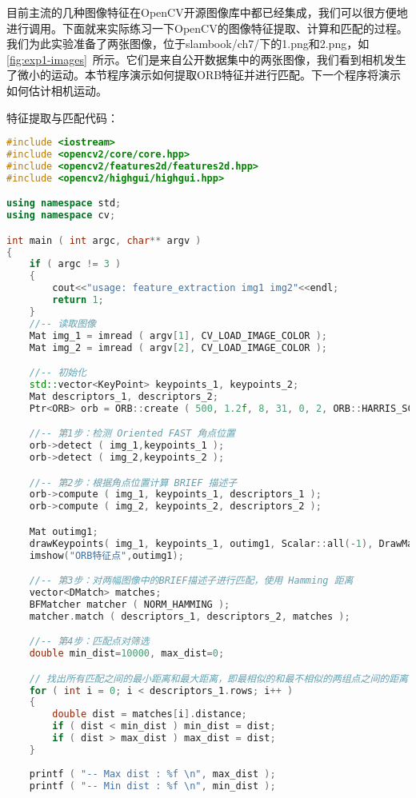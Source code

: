 目前主流的几种图像特征在OpenCV开源图像库中都已经集成，我们可以很方便地进行调用。下面就来实际练习一下OpenCV的图像特征提取、计算和匹配的过程。我们为此实验准备了两张图像，位于slambook/ch7/下的1.png和2.png，如\autoref{fig:exp1-images}~所示。它们是来自公开数据集\cite{Sturm2012}中的两张图像，我们看到相机发生了微小的运动。本节程序演示如何提取ORB特征并进行匹配。下一个程序将演示如何估计相机运动。

特征提取与匹配代码：
\begin{lstlisting}[language=c++,caption=slambook/ch7/feature_extraction.cpp]
#include <iostream>
#include <opencv2/core/core.hpp>
#include <opencv2/features2d/features2d.hpp>
#include <opencv2/highgui/highgui.hpp>

using namespace std;
using namespace cv;

int main ( int argc, char** argv )
{
	if ( argc != 3 )
	{
		cout<<"usage: feature_extraction img1 img2"<<endl;
		return 1;
	}
	//-- 读取图像
	Mat img_1 = imread ( argv[1], CV_LOAD_IMAGE_COLOR );
	Mat img_2 = imread ( argv[2], CV_LOAD_IMAGE_COLOR );

	//-- 初始化
	std::vector<KeyPoint> keypoints_1, keypoints_2;
	Mat descriptors_1, descriptors_2;
	Ptr<ORB> orb = ORB::create ( 500, 1.2f, 8, 31, 0, 2, ORB::HARRIS_SCORE,31,20 );

	//-- 第1步：检测 Oriented FAST 角点位置
	orb->detect ( img_1,keypoints_1 );
	orb->detect ( img_2,keypoints_2 );

	//-- 第2步：根据角点位置计算 BRIEF 描述子
	orb->compute ( img_1, keypoints_1, descriptors_1 );
	orb->compute ( img_2, keypoints_2, descriptors_2 );

	Mat outimg1;
	drawKeypoints( img_1, keypoints_1, outimg1, Scalar::all(-1), DrawMatchesFlags::DEFAULT );
	imshow("ORB特征点",outimg1);

	//-- 第3步：对两幅图像中的BRIEF描述子进行匹配，使用 Hamming 距离
	vector<DMatch> matches;
	BFMatcher matcher ( NORM_HAMMING );
	matcher.match ( descriptors_1, descriptors_2, matches );

	//-- 第4步：匹配点对筛选
	double min_dist=10000, max_dist=0;

	// 找出所有匹配之间的最小距离和最大距离，即最相似的和最不相似的两组点之间的距离
	for ( int i = 0; i < descriptors_1.rows; i++ )
	{
		double dist = matches[i].distance;
		if ( dist < min_dist ) min_dist = dist;
		if ( dist > max_dist ) max_dist = dist;
	}
	
	printf ( "-- Max dist : %f \n", max_dist );
	printf ( "-- Min dist : %f \n", min_dist );


\end{lstlisting}
